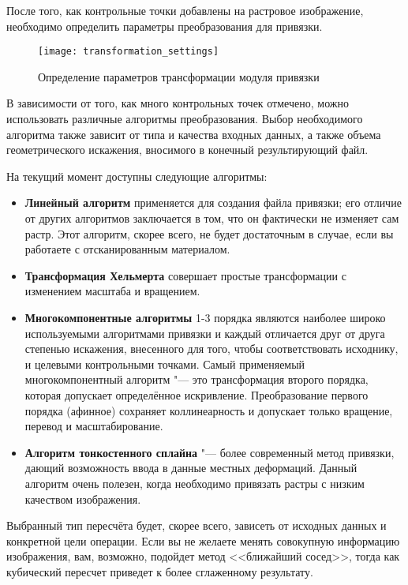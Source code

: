 После того, как контрольные точки добавлены на растровое изображение,
необходимо определить параметры преобразования для привязки.

\begin{figure}[ht]
\centering
  \texttt{[image: transformation\_settings]}
  \caption{Определение параметров трансформации модуля привязки \wincaption}\label{fig:georef_transform}
\end{figure}


В зависимости от того, как много контрольных точек отмечено, можно
использовать различные алгоритмы преобразования. Выбор необходимого
алгоритма также зависит от типа и качества входных данных, а также
объема геометрического искажения, вносимого в конечный результирующий
файл.

На текущий момент доступны следующие алгоритмы:

\begin{itemize}[label=--]
\item \textbf{Линейный алгоритм} применяется для создания файла
привязки; его отличие от других алгоритмов заключается в том, что он
фактически не изменяет сам растр. Этот алгоритм, скорее всего, не будет
достаточным в случае, если вы работаете с отсканированным материалом.
\item \textbf{Трансформация Хельмерта} совершает простые трансформации
с изменением масштаба и вращением.
\item \textbf{Многокомпонентные алгоритмы} 1-3 порядка являются
наиболее широко используемыми алгоритмами привязки и каждый отличается
друг от друга степенью искажения, внесенного для того, чтобы
соответствовать исходнику, и целевыми контрольными точками. Самый
применяемый многокомпонентный алгоритм "--- это трансформация второго
порядка, которая допускает определённое искривление. Преобразование
первого порядка (афинное) сохраняет коллинеарность и допускает только
вращение, перевод и масштабирование.
\item \textbf{Алгоритм тонкостенного сплайна} "--- более современный
метод привязки, дающий возможность ввода в данные местных деформаций.
Данный алгоритм очень полезен, когда необходимо привязать растры с
низким качеством изображения.
\end{itemize}


Выбранный тип пересчёта будет, скорее всего, зависеть от исходных данных
и конкретной цели операции. Если вы не желаете менять совокупную
информацию изображения, вам, возможно, подойдет метод <<ближайший сосед>>,
тогда как кубический пересчет приведет к более сглаженному результату.

